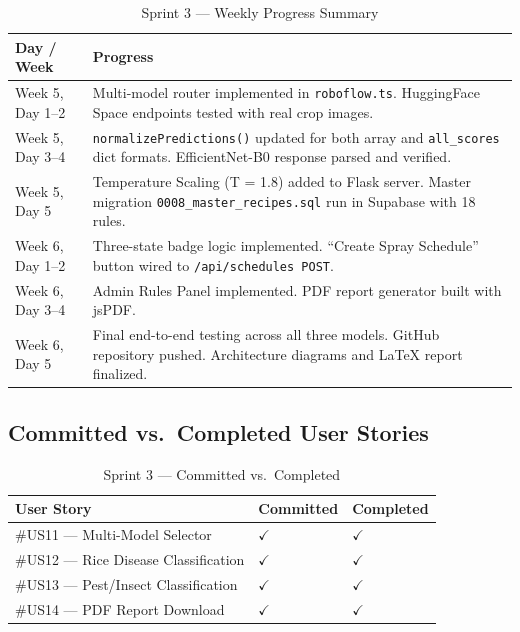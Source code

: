 \documentclass[12pt,a4paper]{report}
\begin{document}
\begin{table}[H]
\centering
\caption{Sprint 3 --- Weekly Progress Summary}
\label{tab:sprint3_progress}
\renewcommand{\arraystretch}{1.4}
\begin{tabular}{|p{3cm}|p{10.5cm}|}
\hline
\textbf{Day / Week} & \textbf{Progress} \\
\hline
Week 5, Day 1--2 & Multi-model router implemented in \texttt{roboflow.ts}. HuggingFace Space endpoints tested with real crop images. \\
\hline
Week 5, Day 3--4 & \texttt{normalizePredictions()} updated for both array and \texttt{all\_scores} dict formats. EfficientNet-B0 response parsed and verified. \\
\hline
Week 5, Day 5 & Temperature Scaling (T = 1.8) added to Flask server. Master migration \texttt{0008\_master\_recipes.sql} run in Supabase with 18 rules. \\
\hline
Week 6, Day 1--2 & Three-state badge logic implemented. ``Create Spray Schedule'' button wired to \texttt{/api/schedules POST}. \\
\hline
Week 6, Day 3--4 & Admin Rules Panel implemented. PDF report generator built with jsPDF. \\
\hline
Week 6, Day 5 & Final end-to-end testing across all three models. GitHub repository pushed. Architecture diagrams and LaTeX report finalized. \\
\hline
\end{tabular}
\end{table}

\subsection{Committed vs.\ Completed User Stories}

\begin{table}[H]
\centering
\caption{Sprint 3 --- Committed vs.\ Completed}
\label{tab:sprint3_cvc}
\renewcommand{\arraystretch}{1.4}
\begin{tabular}{|p{8cm}|p{2.5cm}|p{2.5cm}|}
\hline
\textbf{User Story} & \textbf{Committed} & \textbf{Completed} \\
\hline
\#US11 --- Multi-Model Selector & $\checkmark$ & $\checkmark$ \\
\hline
\#US12 --- Rice Disease Classification & $\checkmark$ & $\checkmark$ \\
\hline
\#US13 --- Pest/Insect Classification & $\checkmark$ & $\checkmark$ \\
\hline
\#US14 --- PDF Report Download & $\checkmark$ & $\checkmark$ \\
\hline
\end{tabular}
\end{table}
\end{document}
